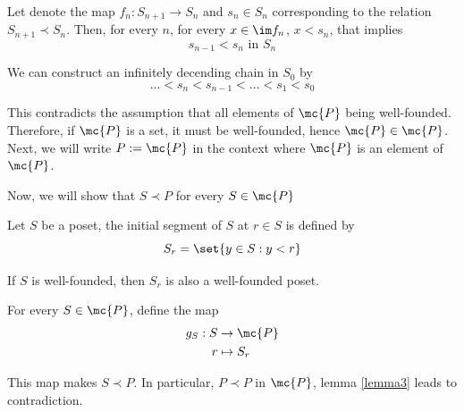 \documentclass{article}
\begin{document}
Let denote the map $f_n: S_{n+1} \to S_n$ and $s_n \in S_n$ corresponding to the relation $S_{n+1} \prec S_n$. Then, for every $n$, for every $x \in \im f_n$, $x < s_n$, that implies
$$
	s_{n-1} < s_n \text{ in } S_n
$$

We can construct an infinitely decending chain in $S_0$ by
$$
	... < s_n < s_{n-1} < ... < s_1 < s_0
$$

This contradicts the assumption that all elements of $\mc{P}$ being well-founded. Therefore, if $\mc{P}$ is a set, it must be well-founded, hence $\mc{P} \in \mc{P}$. Next, we will write $P := \mc{P}$ in the context where $\mc{P}$ is an element of $\mc{P}$. 

Now, we will show that $S \prec P$ for every $S \in \mc{P}$

\begin{definition}
	Let $S$ be a poset, the initial segment of $S$ at $r \in S$ is defined by
	$$
		S_r = \set{y \in S: y < r}
	$$
	
	If $S$ is well-founded, then $S_r$ is also a well-founded poset.	
\end{definition}

For every $S \in \mc{P}$, define the map
\begin{align*}
	g_S: S &\to \mc{P} \\
	r &\mapsto S_r
\end{align*}

This map makes $S \prec P$. In particular, $P \prec P$ in $\mc{P}$, lemma \ref{lemma3}  leads to contradiction.


\end{document}
